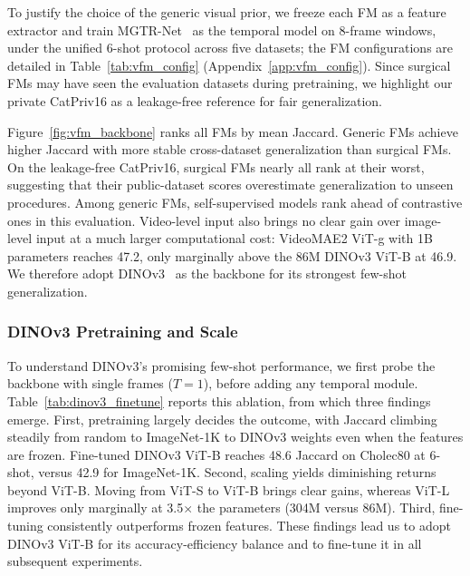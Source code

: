 To justify the choice of the generic visual prior, we freeze each FM as a
feature extractor and train MGTR-Net~\cite{huang2025multi} as the temporal
model on 8-frame windows, under the unified 6-shot protocol across five
datasets; the FM configurations are detailed in Table~\ref{tab:vfm_config}
(Appendix~\ref{app:vfm_config}).
Since surgical FMs may have seen the evaluation datasets during pretraining, we
highlight our private CatPriv16 as a leakage-free reference for fair generalization.

Figure~\ref{fig:vfm_backbone} ranks all FMs by mean Jaccard.
Generic FMs achieve higher Jaccard with more stable cross-dataset
generalization than surgical FMs.
On the leakage-free CatPriv16, surgical FMs nearly all rank at their worst,
suggesting that their public-dataset scores overestimate generalization to
unseen procedures.
Among generic FMs, self-supervised models rank ahead of contrastive ones in
this evaluation.
Video-level input also brings no clear gain over image-level input at a much
larger computational cost: VideoMAE2 ViT-g with 1B parameters reaches 47.2,
only marginally above the 86M DINOv3 ViT-B at 46.9.
We therefore adopt DINOv3~\cite{simeoni2025dinov3} as the backbone for its
strongest few-shot generalization.


\subsubsection{DINOv3 Pretraining and Scale}
To understand DINOv3's promising few-shot performance, we first probe
the backbone with single frames ($T{=}1$), before adding any temporal module.
Table~\ref{tab:dinov3_finetune} reports this ablation, from which three findings
emerge.
First, pretraining largely decides the outcome, with Jaccard climbing steadily from
random to ImageNet-1K to DINOv3 weights even when the features are frozen.
Fine-tuned DINOv3 ViT-B reaches 48.6 Jaccard on Cholec80 at 6-shot, versus 42.9 for
ImageNet-1K.
Second, scaling yields diminishing returns beyond ViT-B.
Moving from ViT-S to ViT-B brings clear gains, whereas ViT-L improves only marginally
at 3.5$\times$ the parameters (304M versus 86M).
Third, fine-tuning consistently outperforms frozen features.
These findings lead us to adopt DINOv3 ViT-B for its accuracy-efficiency balance and
to fine-tune it in all subsequent experiments.


